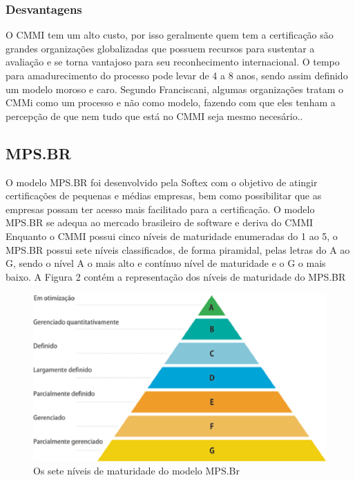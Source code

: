 \subsubsection{Desvantagens}

  O CMMI tem um alto custo, por isso geralmente quem tem a certificação são
  grandes organizações globalizadas que possuem recursos para sustentar a
  avaliação e se torna vantajoso para seu reconhecimento internacional. O
  tempo para amadurecimento do processo pode levar de 4 a 8 anos, sendo assim
  definido um modelo moroso e caro. Segundo Franciscani, algumas organizações
  tratam o CMMi como um processo e não como modelo, fazendo com que eles tenham
  a percepção de que nem tudo que está no CMMI seja mesmo necesário.\cite{francis2012}.

\subsection{MPS.BR}

  O modelo MPS.BR foi desenvolvido pela Softex com o objetivo de atingir
  certificações de pequenas e médias empresas, bem como possibilitar que
  as empresas possam ter acesso mais facilitado para a certificação.
  O modelo MPS.BR se adequa ao mercado brasileiro de software e deriva do CMMI
  Enquanto o CMMI possui cinco níveis de maturidade enumeradas do 1 ao 5, o
  MPS.BR possui sete níveis classificados, de forma piramidal,  pelas letras
  do A ao G, sendo o nível A o mais alto e contínuo nível de maturidade e o G
  o mais baixo. A Figura 2 contém a representação dos níveis de maturidade do
  MPS.BR

  \begin{figure}[!ht]
    \centering
    \includegraphics[width=15cm, keepaspectratio=true]{figuras/maturidade/niveis-mpsbr.eps}
    \caption{Os sete níveis de maturidade do modelo MPS.Br}
  \end{figure}

